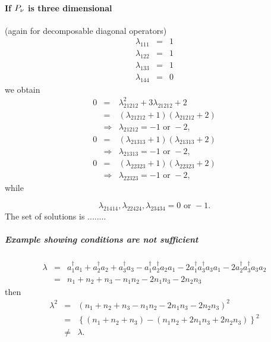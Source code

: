 \documentclass[12pt]{article}
\begin{document}
\paragraph{ If $P_{\mathcal{\protect\nu }}$ is three dimensional}

(again for decomposable diagonal operators)%
\begin{eqnarray*}
\lambda _{111} &=&1 \\
\lambda _{122} &=&1 \\
\lambda _{133} &=&1 \\
\lambda _{144} &=&0
\end{eqnarray*}%
we obtain 
\begin{eqnarray*}
0 &=&\lambda _{21212}^{2}+3\lambda _{21212}+2 \\
&=&\left( \lambda _{21212}+1\right) \left( \lambda _{21212}+2\right) \\
&\Rightarrow &\lambda _{21212}=-1\text{ or }-2,
\end{eqnarray*}%
\begin{eqnarray*}
0 &=&\left( \lambda _{21313}+1\right) \left( \lambda _{21313}+2\right) \\
&\Rightarrow &\lambda _{21313}=-1\text{ or }-2,
\end{eqnarray*}%
\begin{eqnarray*}
0 &=&\left( \lambda _{22323}+1\right) \left( \lambda _{22323}+2\right) \\
&\Rightarrow &\lambda _{22323}=-1\text{ or }-2,
\end{eqnarray*}%
while

\begin{equation*}
\lambda _{21414},\lambda _{22424},\lambda _{23434}=0\text{ or }-1.
\end{equation*}%
The set of solutions is ........

\subparagraph{Example showing conditions are not sufficient}

\begin{eqnarray*}
\lambda &=&a_{1}^{\dagger }a_{1}+a_{2}^{\dagger }a_{2}+a_{3}^{\dagger
}a_{3}-a_{1}^{\dagger }a_{2}^{\dagger }a_{2}a_{1}-2a_{1}^{\dagger
}a_{3}^{\dagger }a_{3}a_{1}-2a_{2}^{\dagger }a_{3}^{\dagger }a_{3}a_{2} \\
&=&n_{1}+n_{2}+n_{3}-n_{1}n_{2}-2n_{1}n_{3}-2n_{2}n_{3}
\end{eqnarray*}%
then%
\begin{eqnarray*}
\lambda ^{2} &=&\left(
n_{1}+n_{2}+n_{3}-n_{1}n_{2}-2n_{1}n_{3}-2n_{2}n_{3}\right) ^{2} \\
&=&\left\{ \left( n_{1}+n_{2}+n_{3}\right) -\left(
n_{1}n_{2}+2n_{1}n_{3}+2n_{2}n_{3}\right) \right\} ^{2} \\
&\neq &\lambda .
\end{eqnarray*}
\end{document}
